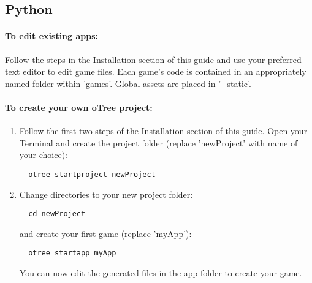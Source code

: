 \documentclass{article}
\begin{document}
		\subsection{Python}
			\paragraph{To edit existing apps:} Follow the steps in the Installation section of this guide and use your preferred text editor to edit game files. Each game's code is contained in an appropriately named folder within 'games'. Global assets are placed in '\_static'.
			\paragraph{To create your own oTree project:} 
				\begin{enumerate}
					\item Follow the first two steps of the Installation section of this guide. Open your Terminal and create the project folder (replace 'newProject' with name of your choice):
					 \begin{lstlisting}
  otree startproject newProject
					 \end{lstlisting}
					 \item Change directories to your new project folder:
					 \begin{lstlisting}
  cd newProject
					 \end{lstlisting}
					 and create your first game (replace 'myApp'):
					 \begin{lstlisting}
  otree startapp myApp
					 \end{lstlisting}
					 You can now edit the generated files in the app folder to create your game.
				\end{enumerate}
	  
\end{document}
